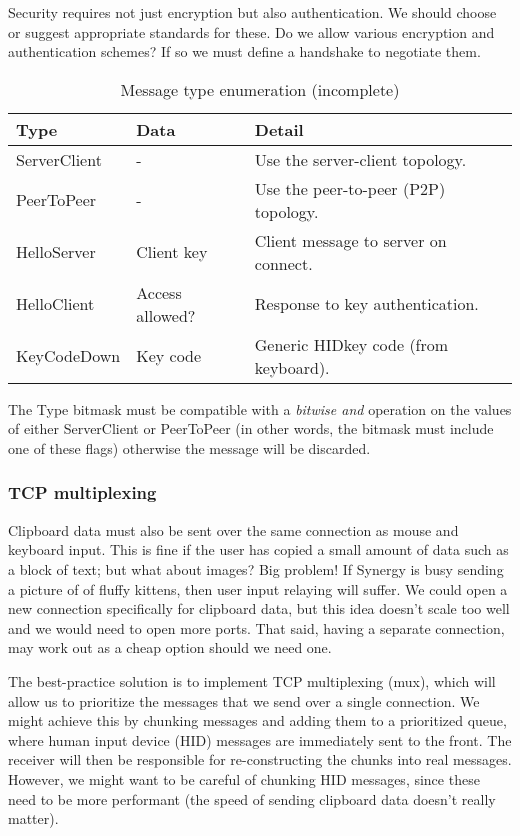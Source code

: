 Security requires not just encryption but also authentication. We should choose
or suggest appropriate standards for these. Do we allow various encryption and
authentication schemes? If so we must define a handshake to negotiate them.

\begin{table}[ht!]
  \begin{tabular}{|l|l|l|}
    \hline
    \textbf{Type} &
    \textbf{Data} &
    \textbf{Detail} \\
    \hline
    ServerClient & - & Use the server-client topology. \\
    PeerToPeer & - & Use the peer-to-peer (P2P) topology. \\
    HelloServer & Client key & Client message to server on connect. \\
    HelloClient & Access allowed? & Response to key authentication. \\
    KeyCodeDown & Key code & Generic HID\footnotemark key code (from 
    keyboard). \\
    \hline
  \end{tabular}
  \caption{Message type enumeration (incomplete)}
  \label{tab:messageTypes}
\end{table}

The Type bitmask must be compatible with a \textit{bitwise and} operation on
the values of either ServerClient or PeerToPeer (in other words, the bitmask
must include one of these flags) otherwise the message will be discarded.


\subsubsection{TCP multiplexing}

Clipboard data must also be sent over the same connection as mouse and
keyboard input. This is fine if the user has copied a small amount of data
such as a block of text; but what about images? Big problem! If Synergy is busy
sending a picture of of fluffy kittens, then user input relaying will suffer.
We could open a new connection specifically for clipboard data, but this idea
doesn't scale too well and we would need to open more ports. That said, having
a separate connection, may work out as a cheap option should we need one.

The best-practice solution is to implement TCP multiplexing (mux), which will 
allow us to prioritize the messages that we send over a single connection. We
might achieve this by chunking messages and adding them to a prioritized queue,
where human input device (HID) messages are immediately sent to the front. The
receiver will then be responsible for re-constructing the chunks into real 
messages. However, we might want to be careful of chunking HID messages, since 
these need to be more performant (the speed of sending clipboard data doesn't 
really matter).

